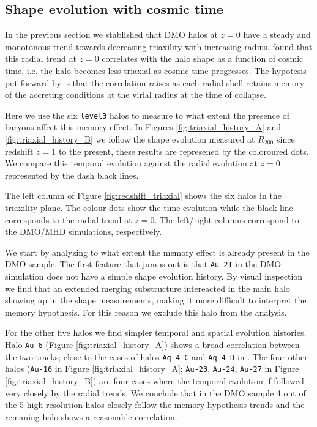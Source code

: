 \documentclass[a4paper,fleqn,usenatbib]{mnras}
\begin{document}
\subsection{Shape evolution with cosmic time}

In the previous section we stablished that DMO halos at $z=0$ have
a steady and monotonous trend towards decreasing triaxility with
increasing radius.
\cite{VeraCiro11} found that this  radial trend at $z=0$ 
correlates with the halo shape as a function of cosmic time, i.e.
the halo becomes less triaxial as cosmic time progresses. 
The hypotesis put forward by \cite{VeraCiro11} is that the correlation
raises as each radial shell retains memory of the accreting conditions
at the virial radius at the time of collapse.

Here we use the six \texttt{level3} halos to measure to what extent
the presence of baryons affect this memory effect.
In Figures \ref{fig:triaxial_history_A} and
\ref{fig:triaxial_history_B} we follow the shape evolution measured at
$R_{200}$ since redshift $z=1$ to the present, these results are
represened by the coloroured dots.
We compare this temporal evolution against the radial evolution at
$z=0$ represented by the dash black lines. 

The left column of Figure \ref{fig:redshift_triaxial} shows the six
halos in the triaxility plane. 
The colour dots show the time evolution while the black line
corresponds to the radial trend at $z=0$.
The left/right columns correspond to the DMO/MHD simulations, respectively.


We start by analyzing to what extent the memory effect is
already present in the DMO sample. 
The first feature that jumps out is that \texttt{Au-21} in the DMO
simulation does not have a simple shape evolution history.
By visual inspection we find that an extended merging substructure
intereacted in the main halo showing up in the shape measurements,
making it more difficult to interpret the memory hypothesis.
For this reason we exclude this halo from the analysis.

For the other five halos we find simpler temporal and spatial
evolution histories. 
Halo \texttt{Au-6} (Figure
\ref{fig:triaxial_history_A}) shows a broad
correlation between the two tracks; close to the cases of halos
\texttt{Aq-4-C} and \texttt{Aq-4-D} in \cite{VeraCiro11}.
The four other halos (\texttt{Au-16} in Figure
\ref{fig:triaxial_history_A}; \texttt{Au-23}, \texttt{Au-24},
\texttt{Au-27} in Figure \ref{fig:triaxial_history_B}) are four
cases where the temporal evolution if followed very closely by the
radial trends.
We conclude that in the DMO sample 4 out of the 5 high resolution
halos closely follow the memory hypothesis trends and the remaning
halo shows a reasonable correlation.
\end{document}
